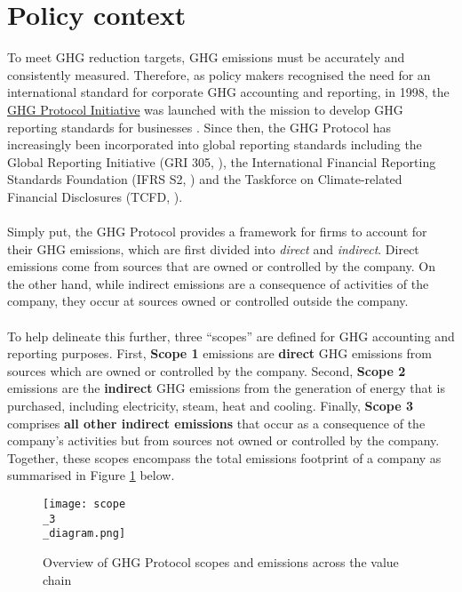 \documentclass[12pt,twoside]{report}
\newcommand\fnote[1]{\captionsetup{font=scriptsize, justification=raggedright, singlelinecheck=false}\subcaption*{\textit{#1}}}
\begin{document}
\section{Policy context}\label{sec:PolicyContext}
To meet GHG reduction targets, GHG emissions must be accurately and consistently measured. Therefore, as policy makers recognised the need for an international standard for corporate GHG accounting and reporting, in 1998, the \href{https://ghgprotocol.org/about-us}{GHG Protocol Initiative} was launched with the mission to develop GHG reporting standards for businesses \cite{ghgprotocol2004}. Since then, the GHG Protocol has increasingly been incorporated into global reporting standards including the Global Reporting Initiative (GRI 305, \cite{gri2016}), the International Financial Reporting Standards Foundation (IFRS S2, \cite{ifrs2023}) and the Taskforce on Climate-related Financial Disclosures (TCFD, \cite{tcfd2021}).
\\ \\
Simply put, the GHG Protocol provides a framework for firms to account for their GHG emissions, which are first divided into \textit{direct} and \textit{indirect}. Direct emissions come from sources that are owned or controlled by the company. On the other hand, while indirect emissions are a consequence of activities of the company, they occur at sources owned or controlled outside the company. 
\\ \\
To help delineate this further, three ``scopes'' are defined for GHG accounting and reporting purposes. First,  \textbf{Scope 1} emissions are \textbf{direct} GHG emissions from sources which are owned or controlled by the company. Second, \textbf{Scope 2} emissions are the \textbf{indirect} GHG emissions from the generation of energy that is purchased, including electricity, steam, heat and cooling. Finally, \textbf{Scope 3} comprises \textbf{all other indirect emissions} that occur as a consequence of the company's activities but from sources not owned or controlled by the company. Together, these scopes encompass the total emissions footprint of a company as summarised in Figure \ref{fig:Scope3Diagram} below.

\begin{figure}[H]
	\centering
	\caption{Overview of GHG Protocol scopes and emissions across the value chain}
	\label{fig:Scope3Diagram}
	\texttt{[image: scope\\\_3\\\_diagram.png]}
	\fnote{Source: \cite{ghgscope32013}, p.6}
\end{figure}
\end{document}
